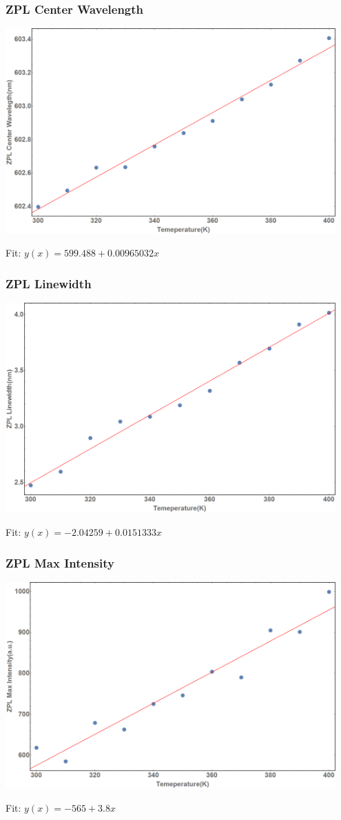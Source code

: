 \documentclass{beamer}
\begin{document}
\begin{frame}\frametitle{ZPL Center Wavelength}
    \includegraphics[width=0.95\textwidth]{Images/ZPFCenter.png}

    Fit: $y(x) = 599.488 + 0.00965032x$
\end{frame}

\begin{frame}\frametitle{ZPL Linewidth}
    \includegraphics[width=0.95\textwidth]{Images/ZPFLineWidth.png}

    Fit: $y(x) = -2.04259 + 0.0151333x$
\end{frame}

\begin{frame}\frametitle{ZPL Max Intensity}
    \includegraphics[width=0.95\textwidth]{Images/ZPFMaxIntensity.png}

    Fit: $y(x) = -565 + 3.8x$
\end{frame}
\end{document}
